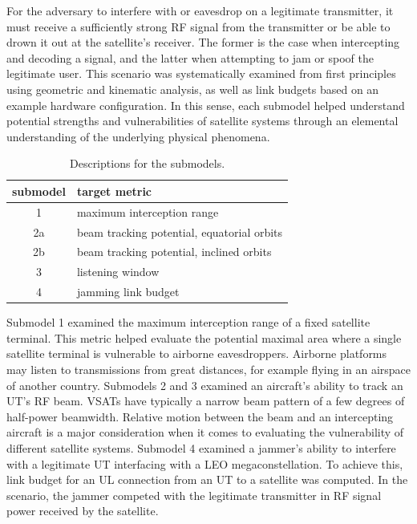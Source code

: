 \documentclass[english, 12pt, a4paper, elec, utf8, a-1b, online]{aaltothesis}
\begin{document}
For the adversary to interfere with or eavesdrop on a legitimate transmitter, it must receive a sufficiently strong RF signal from the transmitter or be able to drown it out at the satellite's receiver.
The former is the case when intercepting and decoding a signal, and the latter when attempting to jam or spoof the legitimate user.
This scenario was systematically examined from first principles using geometric and kinematic analysis, as well as link budgets based on an example hardware configuration.
In this sense, each submodel helped understand potential strengths and vulnerabilities of satellite systems through an elemental understanding of the underlying physical phenomena.

\begin{table}[h]
  \centering
  \caption{Descriptions for the submodels.}
  \begin{tabular}{@{}cl@{}}
  \toprule
  \multicolumn{1}{l}{submodel}  & target metric                              \\ \midrule
  1                             & maximum interception range                 \\
  2a                            & beam tracking potential, equatorial orbits \\
  2b                            & beam tracking potential, inclined orbits   \\
  3                             & listening window                           \\
  4                             & jamming link budget                        \\ \bottomrule
  \end{tabular}
  \label{table-submodel-descriptions}
\end{table}

Submodel 1 examined the maximum interception range of a fixed satellite terminal.
This metric helped evaluate the potential maximal area where a single satellite terminal is vulnerable to airborne eavesdroppers.
Airborne platforms may listen to transmissions from great distances, for example flying in an airspace of another country.
Submodels 2 and 3 examined an aircraft's ability to track an UT's RF beam.
VSATs have typically a narrow beam pattern of a few degrees of half-power beamwidth.
Relative motion between the beam and an intercepting aircraft is a major consideration when it comes to evaluating the vulnerability of different satellite systems.
Submodel 4 examined a jammer's ability to interfere with a legitimate UT interfacing with a LEO megaconstellation.
To achieve this, link budget for an UL connection from an UT to a satellite was computed.
In the scenario, the jammer competed with the legitimate transmitter in RF signal power received by the satellite.
\end{document}
